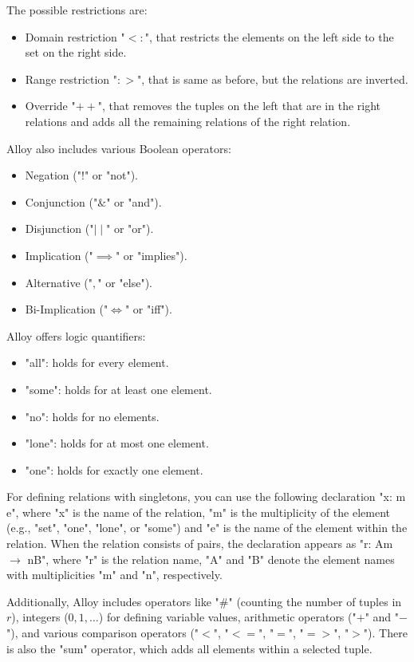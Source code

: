     The possible restrictions are: 
    \begin{itemize}
        \item Domain restriction "$<:$", that restricts the elements on the left side to the set on the right side.
        \item Range restriction "$:>$", that is same as before, but the relations are inverted. 
        \item Override "$++$", that removes the tuples on the left that are in the right relations and adds all the remaining relations of the right relation. 
    \end{itemize}
    Alloy also includes various Boolean operators:
    \begin{itemize}
        \item Negation ("$!$" or "not"). 
        \item Conjunction ("$\&$" or "and"). 
        \item Disjunction ("$\mid \mid$" or "or"). 
        \item Implication ("$\implies$" or "implies"). 
        \item Alternative ("$,$" or "else"). 
        \item Bi-Implication ("$\iff$" or "iff").
    \end{itemize}
    Alloy offers logic quantifiers:
    \begin{itemize}
        \item "all": holds for every element.
        \item "some": holds for at least one element.
        \item "no": holds for no elements.
        \item "lone": holds for at most one element.
        \item "one": holds for exactly one element.
    \end{itemize}
    For defining relations with singletons, you can use the following declaration "x: m e", where "x" is the name of the relation, "m" is the multiplicity of the element (e.g., "set", "one", "lone", or "some") and "e" is the name of the element within the relation. 
    When the relation consists of pairs, the declaration appears as "r: Am $\rightarrow$ nB", where "r" is the relation name, "A" and "B" denote the element names with multiplicities "m" and "n", respectively.
        
    Additionally, Alloy includes operators like "$\#$" (counting the number of tuples in $r$), integers ($0,1,\dots$) for defining variable values, arithmetic operators ("$+$" and "$-$"), and various comparison operators ("$<$", "$<=$", "$=$", "$=>$", "$>$"). 
    There is also the "sum" operator, which adds all elements within a selected tuple.
    
